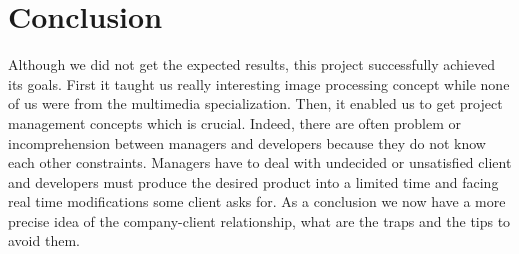 
\section{Conclusion}
Although we did not get the expected results, this project successfully achieved its goals. First it taught us really interesting image processing concept while none of us were from the multimedia specialization. Then, it enabled us to get project management concepts which is crucial. Indeed, there are often problem or incomprehension between managers and developers because they do not know each other constraints. Managers have to deal with undecided or unsatisfied client and developers must produce the desired product into a limited time and facing real time modifications some client asks for. As a conclusion we now have a more precise idea of the company-client relationship, what are the traps and the tips to avoid them.\\